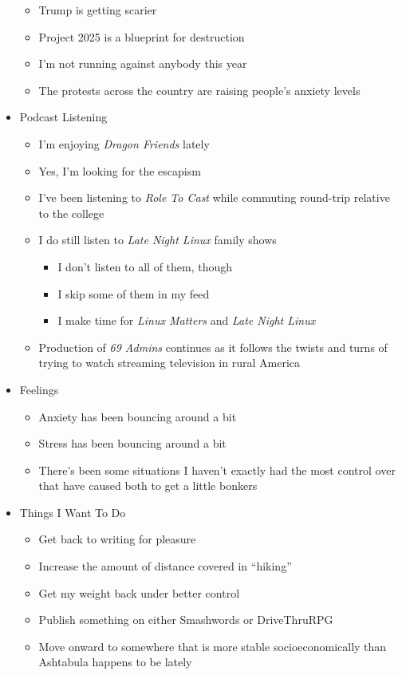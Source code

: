\begin{itemize}
  \begin{itemize}
  \tightlist
  \item
    Trump is getting scarier
  \item
    Project 2025 is a blueprint for destruction
  \item
    I'm not running against anybody this year
  \item
    The protests across the country are raising people's anxiety levels
  \end{itemize}
\item
  Podcast Listening

  \begin{itemize}
  \tightlist
  \item
    I'm enjoying \emph{Dragon Friends} lately
  \item
    Yes, I'm looking for the escapism
  \item
    I've been listening to \emph{Role To Cast} while commuting
    round-trip relative to the college
  \item
    I do still listen to \emph{Late Night Linux} family shows

    \begin{itemize}
    \tightlist
    \item
      I don't listen to all of them, though
    \item
      I skip some of them in my feed
    \item
      I make time for \emph{Linux Matters} and \emph{Late Night Linux}
    \end{itemize}
  \item
    Production of \emph{69 Admins} continues as it follows the twists
    and turns of trying to watch streaming television in rural America
  \end{itemize}
\item
  Feelings

  \begin{itemize}
  \tightlist
  \item
    Anxiety has been bouncing around a bit
  \item
    Stress has been bouncing around a bit
  \item
    There's been some situations I haven't exactly had the most control
    over that have caused both to get a little bonkers
  \end{itemize}
\item
  Things I Want To Do

  \begin{itemize}
  \tightlist
  \item
    Get back to writing for pleasure
  \item
    Increase the amount of distance covered in ``hiking''
  \item
    Get my weight back under better control
  \item
    Publish something on either Smashwords or DriveThruRPG
  \item
    Move onward to somewhere that is more stable socioeconomically than
    Ashtabula happens to be lately
  \end{itemize}
\end{itemize}


